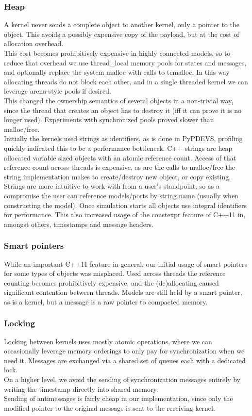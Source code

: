 \subsubsection{Heap}
A kernel never sends a complete object to another kernel, only a pointer to the object. This avoids a possibly expensive copy of the payload, but at the cost of allocation overhead.\\
This cost becomes prohibitively expensive in highly connected models, so to reduce that overhead we use thread\_local memory pools for states and messages, and optionally replace the system malloc with calls to tcmalloc\cite{tcmalloc}. In this way allocating threads do not block each other, and in a single threaded kernel we can leverage arena-style pools if desired.\\
This changed the ownership semantics of several objects in a non-trivial way, since the thread that creates an object has to destroy it (iff it can prove it is no longer used). Experiments with synchronized pools proved slower than malloc/free. \\
Initially the kernels used strings as identifiers, as is done in PyPDEVS, profiling quickly indicated this to be a performance bottleneck. C++ strings are heap allocated variable sized objects with an atomic reference count. Access of that reference count across threads is expensive, as are the calls to malloc/free the string implementation makes to create/destroy new object, or copy existing.\\
Strings are more intuitive to work with from a user's standpoint, so as a compromise the user can reference models/ports by string name (usually when constructing the model). Once simulation starts all objects use integral identifiers for performance. This also increased usage of the constexpr feature of C++11 in, amongst others, timestamps and message headers.
\\
\subsubsection{Smart pointers}
While an important C++11 feature in general, our initial usage of smart pointers for some types of objects was misplaced. Used across threads the reference counting becomes prohibitively expensive, and the (de)allocating caused significant contention between threads. Models are still held by a smart pointer, as is a kernel, but a message is a raw pointer to compacted memory. 
\subsubsection{Locking}
Locking between kernels uses mostly atomic operations, where we can occasionally leverage memory orderings to only pay for synchronization when we need it. Messages are exchanged via a shared set of queues each with a dedicated lock.\\
On a higher level, we avoid the sending of synchronization messages entirely by writing the timestamp directly into shared memory.\\ Sending of antimessages is fairly cheap in our implementation, since only the modified pointer to the original message is sent to the receiving kernel.

